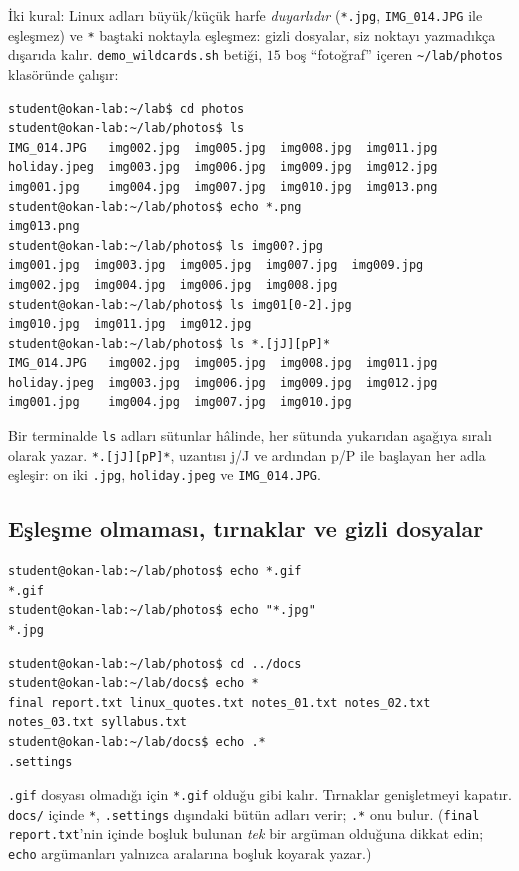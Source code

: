 \documentclass[11pt,a4paper]{article}
\newcommand{\cmd}[1]{\texttt{#1}}
\begin{document}
İki kural: Linux adları büyük/küçük harfe \emph{duyarlıdır} (\texttt{*.jpg}, \texttt{IMG\_014.JPG} ile eşleşmez) ve \texttt{*} baştaki noktayla eşleşmez: gizli dosyalar, siz noktayı yazmadıkça dışarıda kalır. \cmd{demo\_wildcards.sh} betiği, $15$ boş ``fotoğraf'' içeren \texttt{\textasciitilde/lab/photos} klasöründe çalışır:

\begin{lstlisting}[style=term]
student@okan-lab:~/lab$ cd photos
student@okan-lab:~/lab/photos$ ls
IMG_014.JPG   img002.jpg  img005.jpg  img008.jpg  img011.jpg
holiday.jpeg  img003.jpg  img006.jpg  img009.jpg  img012.jpg
img001.jpg    img004.jpg  img007.jpg  img010.jpg  img013.png
student@okan-lab:~/lab/photos$ echo *.png
img013.png
student@okan-lab:~/lab/photos$ ls img00?.jpg
img001.jpg  img003.jpg  img005.jpg  img007.jpg  img009.jpg
img002.jpg  img004.jpg  img006.jpg  img008.jpg
student@okan-lab:~/lab/photos$ ls img01[0-2].jpg
img010.jpg  img011.jpg  img012.jpg
student@okan-lab:~/lab/photos$ ls *.[jJ][pP]*
IMG_014.JPG   img002.jpg  img005.jpg  img008.jpg  img011.jpg
holiday.jpeg  img003.jpg  img006.jpg  img009.jpg  img012.jpg
img001.jpg    img004.jpg  img007.jpg  img010.jpg
\end{lstlisting}

Bir terminalde \cmd{ls} adları sütunlar hâlinde, her sütunda yukarıdan aşağıya sıralı olarak yazar. \texttt{*.[jJ][pP]*}, uzantısı j/J ve ardından p/P ile başlayan her adla eşleşir: on iki \texttt{.jpg}, \texttt{holiday.jpeg} ve \texttt{IMG\_014.JPG}.

\subsection{Eşleşme olmaması, tırnaklar ve gizli dosyalar}

\begin{lstlisting}[style=term]
student@okan-lab:~/lab/photos$ echo *.gif
*.gif
student@okan-lab:~/lab/photos$ echo "*.jpg"
*.jpg
\end{lstlisting}
\begin{lstlisting}[style=term]
student@okan-lab:~/lab/photos$ cd ../docs
student@okan-lab:~/lab/docs$ echo *
final report.txt linux_quotes.txt notes_01.txt notes_02.txt notes_03.txt syllabus.txt
student@okan-lab:~/lab/docs$ echo .*
.settings
\end{lstlisting}

\texttt{.gif} dosyası olmadığı için \texttt{*.gif} olduğu gibi kalır. Tırnaklar genişletmeyi kapatır. \texttt{docs/} içinde \texttt{*}, \texttt{.settings} dışındaki bütün adları verir; \texttt{.*} onu bulur. (\texttt{final report.txt}'nin içinde boşluk bulunan \emph{tek} bir argüman olduğuna dikkat edin; \cmd{echo} argümanları yalnızca aralarına boşluk koyarak yazar.)
\end{document}
